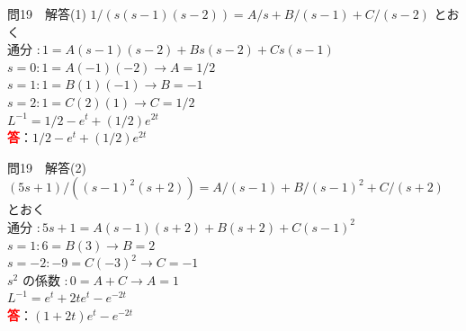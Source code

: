 \documentclass[professionalfonts]{beamer}
\begin{document}
\begin{frame}{問19　解答(1)}
  $1/(s(s-1)(s-2)) = A/s + B/(s-1) + C/(s-2)$ とおく\\[4pt]
  通分 $: 1 = A(s-1)(s-2) + Bs(s-2) + Cs(s-1)$\\[4pt]
  $s=0: 1 = A(-1)(-2) \to A=1/2$\\[4pt]
  $s=1: 1 = B(1)(-1) \to B=-1$\\[4pt]
  $s=2: 1 = C(2)(1) \to C=1/2$\\[4pt]
  $L^{-1} = 1/2 - e^t + (1/2)e^{2t}$
  \\[8pt]\textcolor{red}{\textbf{答}}：$1/2 - e^t + (1/2)e^{2t}$
\end{frame}

\begin{frame}{問19　解答(2)}
  $(5s+1)/((s-1)^{2}(s+2)) = A/(s-1) + B/(s-1)^{2} + C/(s+2)$ とおく\\[4pt]
  通分 $: 5s+1 = A(s-1)(s+2) + B(s+2) + C(s-1)^{2}$\\[4pt]
  $s=1: 6 = B(3) \to B=2$\\[4pt]
  $s=-2: -9 = C(-3)^{2} \to C=-1$\\[4pt]
  $s^{2}$ の係数 $: 0=A+C \to A=1$\\[4pt]
  $L^{-1} = e^t + 2te^t - e^{-2t}$
  \\[8pt]\textcolor{red}{\textbf{答}}：$(1+2t)e^t - e^{-2t}$
\end{frame}
\end{document}
